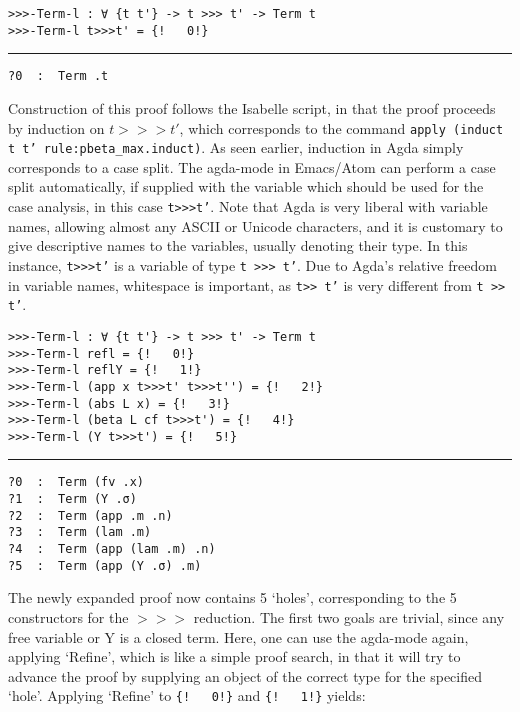 \documentclass[a4paper, 12pt, twoside]{style/ociamthesis}
\let\OldTexttt\texttt
\renewcommand{\texttt}[1]{\small\OldTexttt{#1}}
\begin{document}
\begin{verbatim}
>>>-Term-l : ∀ {t t'} -> t >>> t' -> Term t
>>>-Term-l t>>>t' = {!   0!}
\end{verbatim}

\noindent\rule{8cm}{0.4pt}

\begin{verbatim}
?0  :  Term .t
\end{verbatim}

Construction of this proof follows the Isabelle script, in that the
proof proceeds by induction on \(t >>> t'\), which corresponds to the
command \texttt{apply (induct t t' rule:pbeta\_max.induct)}. As seen
earlier, induction in Agda simply corresponds to a case split. The
agda-mode in Emacs/Atom can perform a case split automatically, if
supplied with the variable which should be used for the case analysis,
in this case \texttt{t>>>t'}. Note that Agda is very liberal with
variable names, allowing almost any ASCII or Unicode characters, and it
is customary to give descriptive names to the variables, usually
denoting their type. In this instance, \texttt{t>>>t'} is a variable of
type \texttt{t >>> t'}. Due to Agda's relative freedom in variable
names, whitespace is important, as \texttt{t>> t'} is very different
from \texttt{t >> t'}.

\begin{verbatim}
>>>-Term-l : ∀ {t t'} -> t >>> t' -> Term t
>>>-Term-l refl = {!   0!}
>>>-Term-l reflY = {!   1!}
>>>-Term-l (app x t>>>t' t>>>t'') = {!   2!}
>>>-Term-l (abs L x) = {!   3!}
>>>-Term-l (beta L cf t>>>t') = {!   4!}
>>>-Term-l (Y t>>>t') = {!   5!}
\end{verbatim}

\noindent\rule{8cm}{0.4pt}

\begin{verbatim}
?0  :  Term (fv .x)
?1  :  Term (Y .σ)
?2  :  Term (app .m .n)
?3  :  Term (lam .m)
?4  :  Term (app (lam .m) .n)
?5  :  Term (app (Y .σ) .m)
\end{verbatim}

The newly expanded proof now contains 5 `holes', corresponding to the 5
constructors for the \(>>>\) reduction. The first two goals are trivial,
since any free variable or Y is a closed term. Here, one can use the
agda-mode again, applying `Refine', which is like a simple proof search,
in that it will try to advance the proof by supplying an object of the
correct type for the specified `hole'. Applying `Refine' to
\texttt{\{!\ \ \ 0!\}} and \texttt{\{!\ \ \ 1!\}} yields:
\end{document}
